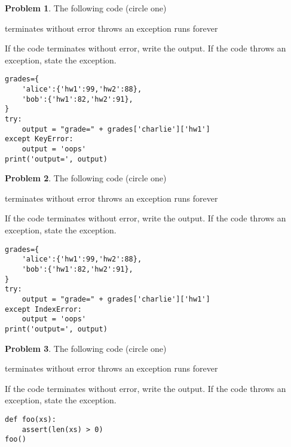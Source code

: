 \documentclass[10pt]{article}
\theoremstyle{definition}
\newtheorem{problem}{Problem}
\begin{document}
\begin{problem}
    The following code (circle one)

    \vspace{0.25in}
    \hspace{0.5in}terminates without error 
    \hspace{1in}throws an exception
    \hspace{1in}runs forever
    \vspace{0.25in}

    \noindent
    If the code terminates without error, write the output.
    If the code throws an exception, state the exception.
\end{problem}
\begin{lstlisting}
grades={
    'alice':{'hw1':99,'hw2':88},
    'bob':{'hw1':82,'hw2':91},
}
try:
    output = "grade=" + grades['charlie']['hw1']
except KeyError:
    output = 'oops'
print('output=', output)
\end{lstlisting}
\vspace{0.75in}


\begin{problem}
    The following code (circle one)

    \vspace{0.25in}
    \hspace{0.5in}terminates without error 
    \hspace{1in}throws an exception
    \hspace{1in}runs forever
    \vspace{0.25in}

    \noindent
    If the code terminates without error, write the output.
    If the code throws an exception, state the exception.
\end{problem}
\begin{lstlisting}
grades={
    'alice':{'hw1':99,'hw2':88},
    'bob':{'hw1':82,'hw2':91},
}
try:
    output = "grade=" + grades['charlie']['hw1']
except IndexError:
    output = 'oops'
print('output=', output)
\end{lstlisting}
\vspace{0.75in}

\begin{problem}
    The following code (circle one)

    \vspace{0.25in}
    \hspace{0.5in}terminates without error 
    \hspace{1in}throws an exception
    \hspace{1in}runs forever
    \vspace{0.25in}

    \noindent
    If the code terminates without error, write the output.
    If the code throws an exception, state the exception.
\end{problem}
\begin{lstlisting}
def foo(xs):
    assert(len(xs) > 0)
foo()
\end{lstlisting}
\vspace{0.75in}
\end{document}
